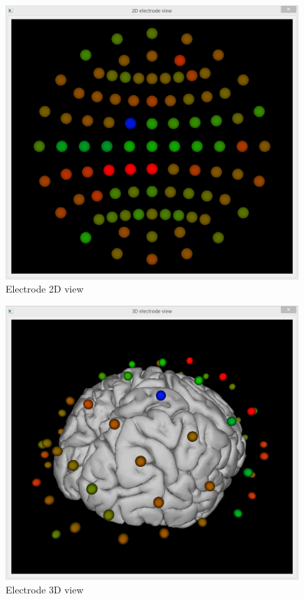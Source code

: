 \begin{figure}[htb]
	\centering
	\includegraphics[width=0.7\linewidth]{fig/view2D.png}
	\caption{Electrode 2D view}
	\label{fig:view2D}
\end{figure}

\begin{figure}[htb]
	\centering
	\includegraphics[width=0.7\linewidth]{fig/view3D.png}
	\caption{Electrode 3D view}
	\label{fig:view3D}
\end{figure}


